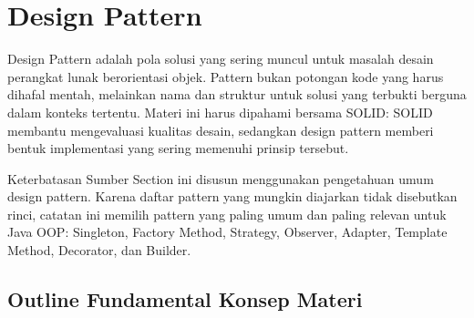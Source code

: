 \section{Design Pattern}

Design Pattern adalah pola solusi yang sering muncul untuk masalah desain perangkat lunak berorientasi objek. Pattern bukan potongan kode yang harus dihafal mentah, melainkan nama dan struktur untuk solusi yang terbukti berguna dalam konteks tertentu. Materi ini harus dipahami bersama SOLID: SOLID membantu mengevaluasi kualitas desain, sedangkan design pattern memberi bentuk implementasi yang sering memenuhi prinsip tersebut.

\begin{cmt}{Keterbatasan Sumber}{}
Section ini disusun menggunakan pengetahuan umum design pattern. Karena daftar pattern yang mungkin diajarkan tidak disebutkan rinci, catatan ini memilih pattern yang paling umum dan paling relevan untuk Java OOP: Singleton, Factory Method, Strategy, Observer, Adapter, Template Method, Decorator, dan Builder.
\end{cmt}

\subsection{Outline Fundamental Konsep Materi}

